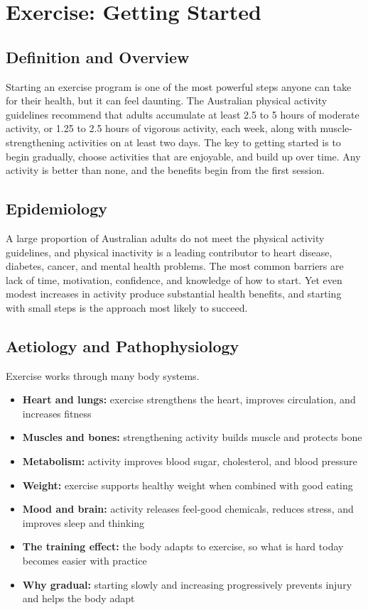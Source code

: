 \chapter{Exercise: Getting Started}

\section*{Definition and Overview}
Starting an exercise program is one of the most powerful steps anyone can take for their health, but it can feel daunting. The Australian physical activity guidelines recommend that adults accumulate at least 2.5 to 5 hours of moderate activity, or 1.25 to 2.5 hours of vigorous activity, each week, along with muscle-strengthening activities on at least two days. The key to getting started is to begin gradually, choose activities that are enjoyable, and build up over time. Any activity is better than none, and the benefits begin from the first session.

\section*{Epidemiology}
A large proportion of Australian adults do not meet the physical activity guidelines, and physical inactivity is a leading contributor to heart disease, diabetes, cancer, and mental health problems. The most common barriers are lack of time, motivation, confidence, and knowledge of how to start. Yet even modest increases in activity produce substantial health benefits, and starting with small steps is the approach most likely to succeed.

\section*{Aetiology and Pathophysiology}
Exercise works through many body systems.
\begin{itemize}
    \item \textbf{Heart and lungs:} exercise strengthens the heart, improves circulation, and increases fitness
    \item \textbf{Muscles and bones:} strengthening activity builds muscle and protects bone
    \item \textbf{Metabolism:} activity improves blood sugar, cholesterol, and blood pressure
    \item \textbf{Weight:} exercise supports healthy weight when combined with good eating
    \item \textbf{Mood and brain:} activity releases feel-good chemicals, reduces stress, and improves sleep and thinking
    \item \textbf{The training effect:} the body adapts to exercise, so what is hard today becomes easier with practice
    \item \textbf{Why gradual:} starting slowly and increasing progressively prevents injury and helps the body adapt
\end{itemize}


